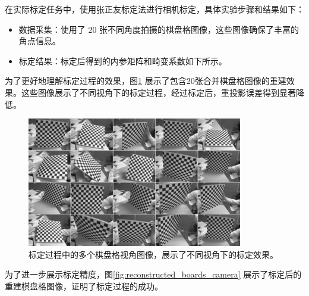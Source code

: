 \documentclass[hyperref,a4paper,UTF8]{ctexart}
\begin{document}
在实际标定任务中，使用张正友标定法进行相机标定，具体实验步骤和结果如下：

\begin{itemize}
    \item 数据采集：使用了 20 张不同角度拍摄的棋盘格图像，这些图像确保了丰富的角点信息。
    \item 标定结果：标定后得到的内参矩阵和畸变系数如下所示。
\end{itemize}

为了更好地理解标定过程的效果，图\ref{fig:multiple_chessboards} 展示了包含20张合并棋盘格图像的重建效果。这些图像展示了不同视角下的标定过程，经过标定后，重投影误差得到显著降低。

\begin{figure}[h]
    \centering
    \includegraphics[width=\textwidth]{assets/356px-Multiple_chessboard_views.png}
    \caption{标定过程中的多个棋盘格视角图像，展示了不同视角下的标定效果。}
    \label{fig:multiple_chessboards}
\end{figure}

为了进一步展示标定精度，图\ref{fig:reconstructed_boards_camera} 展示了标定后的重建棋盘格图像，证明了标定过程的成功。
\end{document}
